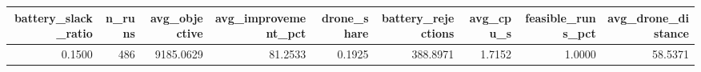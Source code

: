 \begin{tabular}{rrrrrrrrr}
\toprule
battery_slack_ratio & n_runs & avg_objective & avg_improvement_pct & drone_share & battery_rejections & avg_cpu_s & feasible_runs_pct & avg_drone_distance \\
\midrule
0.1500 & 486 & 9185.0629 & 81.2533 & 0.1925 & 388.8971 & 1.7152 & 1.0000 & 58.5371 \\
\bottomrule
\end{tabular}
